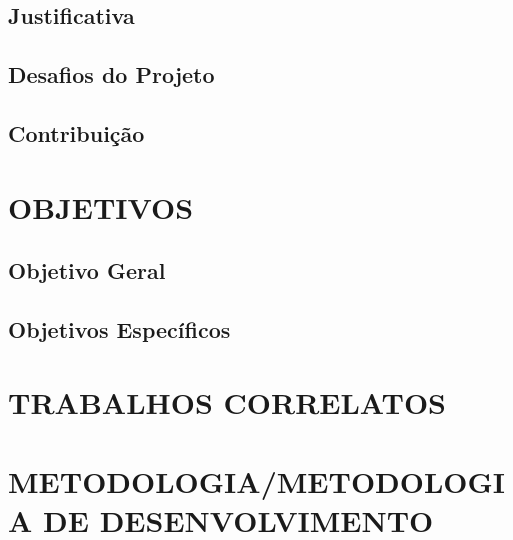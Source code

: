 \subsection{Justificativa}



\subsection{Desafios do Projeto}

\subsection{Contribuição}


\section{OBJETIVOS}
\label{sec:objetivos}

\subsection{Objetivo Geral}
\label{subsec:objgeral}

\subsection{Objetivos Específicos}
\label{subsec:objespc}

\section{TRABALHOS CORRELATOS}
\label{sec:estadoarte}

\section{METODOLOGIA/METODOLOGIA DE DESENVOLVIMENTO} %
\label{sec:metodologia}

